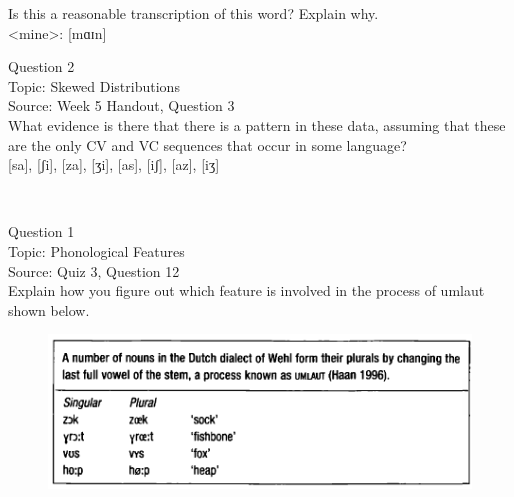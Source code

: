\documentclass[12pt]{article}
\begin{document}
Is this a reasonable transcription of this word? Explain why.\\

<mine>: {[mɑɪn]}


\newpage

{\large Question 2}\\

Topic: Skewed Distributions\\
Source: Week 5 Handout, Question 3\\

What evidence is there that there is a pattern in these data, assuming that these are the only CV and VC sequences that occur in some language?\\

{[sa]}, {[ʃi]}, {[za]}, {[ʒi]}, {[as]}, {[iʃ]}, {[az]}, {[iʒ]}


\newpage

\begin{center}
\textbf{{\color{red}{\HUGE END OF EXAM}}}\\

\end{center}
\newpage

\begin{center}
\textbf{{\color{blue}{\HUGE START OF EXAM\\}}}

\textbf{{\color{blue}{\HUGE Student ID: 19711\\}}}

\textbf{{\color{blue}{\HUGE 4:50\\}}}

\end{center}
\newpage

{\large Question 1}\\

Topic: Phonological Features\\
Source: Quiz 3, Question 12\\

Explain how you figure out which feature is involved in the process of umlaut shown below.\\

\begin{figure}[H]
\includegraphics{../images/dutch.png}
\end{figure}
\end{document}
